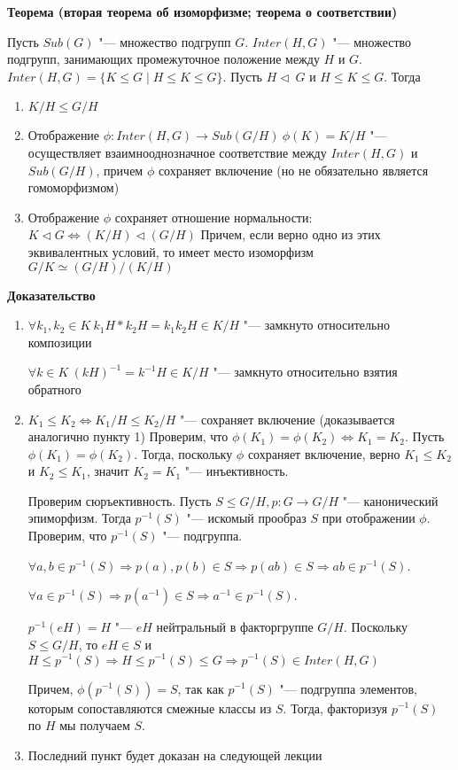 \documentclass{article}
\begin{document}
\vspace{10pt}

\textbf{Теорема (вторая теорема об изоморфизме; теорема о соответствии)}

Пусть $Sub(G)$ "--- множество подгрупп $G$. $Inter(H, G)$ "--- множество подгрупп, занимающих промежуточное положение между $H$ и $G$. $Inter(H, G) = \{ K \leq G \mid H \leq K \leq G\}$. Пусть $H \triangleleft \ G$ и $H \leq K \leq G$. Тогда
\begin{enumerate}
	\item $K/H \leq G/H$
	\item Отображение $\phi: Inter(H, G) \rightarrow Sub(G/H) \  \phi(K) = K/H$ "--- осуществляет взаимнооднозначное соответствие между $Inter(H, G)$ и $Sub(G / H)$, причем $\phi$ сохраняет включение (но не обязательно является гомоморфизмом)
	\item Отображение $\phi$ сохраняет отношение нормальности: $K \triangleleft G \Leftrightarrow (K/H) \triangleleft (G/H)$
	Причем, если верно одно из этих эквивалентных условий, то имеет место изоморфизм $G/K \simeq (G/H)/(K/H)$
\end{enumerate}

\vspace{5pt}

\textbf{Доказательство}
\begin{enumerate}
	\item $\forall k_1, k_2 \in K \  k_1H*k_2H = k_1k_2H \in K/H$ "--- замкнуто относительно композиции
	
	$\forall k \in K \  (kH)^{-1} = k^{-1}H \in K/H$ "--- замкнуто относительно взятия обратного
	
	\item $K_1 \leq K_2 \Leftrightarrow K_1/H \leq K_2/H$ "--- сохраняет включение (доказывается аналогично пункту 1)
	Проверим, что $\phi(K_1) = \phi(K_2) \Leftrightarrow K_1 = K_2$. Пусть $\phi(K_1) = \phi(K_2)$. Тогда, поскольку $\phi$ сохраняет включение, верно $K_1 \leq K_2$ и $K_2 \leq K_1$, значит $K_2 = K_1$ "--- инъективность.
	
	Проверим сюръективность. Пусть $S \leq G/H, p: G \rightarrow G/H$ "--- канонический эпиморфизм. Тогда $p^{-1}(S)$ "--- искомый прообраз $S$ при отображении $\phi$. Проверим, что $p^{-1}(S)$ "--- подгруппа.
	
	$\forall a, b \in p^{-1}(S) \Rightarrow p(a), p(b) \in S \Rightarrow p(ab) \in S \Rightarrow ab \in p^{-1}(S)$.
	
	$\forall a \in p^{-1}(S) \Rightarrow p(a^{-1}) \in S \Rightarrow a^{-1} \in p^{-1}(S)$.
	
	$p^{-1}(eH) = H$ "--- $eH$ нейтральный в факторгруппе $G/H$. Поскольку $S \leq G / H$, то $eH \in S$ и $H \leq p^{-1}(S) \Rightarrow H \leq p^{-1}(S) \leq G \Rightarrow p^{-1}(S) \in Inter(H, G)$
	
	Причем, $\phi(p^{-1}(S)) = S$, так как $p^{-1}(S)$ "--- подгруппа элементов, которым сопоставляются смежные классы из $S$. Тогда, факторизуя $p^{-1}(S)$ по $H$ мы получаем $S$.
	\item Последний пункт будет доказан на следующей лекции
\end{enumerate}
\end{document}
